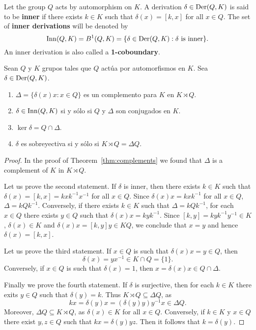 Let the group $Q$ acts by automorphism on $K$.
A derivation $\delta\in\operatorname{Der}(Q,K)$ is said to be \textbf{inner} if there exists $k\in K$ 
such that $\delta(x)=[k,x]$ for all $x\in Q$. The set of 
\textbf{inner derivations} will be denoted by 
\[
		\mathrm{Inn}(Q,K)=B^1(Q,K)=\{\delta\in\operatorname{Der}(Q,K):\text{$\delta$ is inner}\}.
\]
An inner derivation is also called a \textbf{1-coboundary}.

\begin{theorem}[Sysak]
	\label{theorem:Sysak}
	Sean $Q$ y $K$ grupos tales que $Q$ actúa por automorfismos en $K$. Sea
	$\delta\in\operatorname{Der}(Q,K)$.
	\begin{enumerate}
		\item $\Delta=\{\delta(x)x:x\in Q\}$ es un complemento para $K$ en $K\rtimes Q$.
		\item $\delta\in\mathrm{Inn}(Q,K)$ si y sólo si $Q$ y $\Delta$ son conjugados en
			$K$.
		\item $\ker\delta=Q\cap\Delta$.
		\item $\delta$ es sobreyectiva si y sólo si $K\rtimes Q=\Delta Q$.
	\end{enumerate}
\end{theorem}

\begin{proof}
	In the proof of Theorem~\ref{thm:complements} we 
	found that $\Delta$ is a complement of $K$ in $K\rtimes Q$. 

	Let us prove the second statement. If $\delta$ is inner, then there exists 
    $k\in K$ such that $\delta(x)=[k,x]=kxk^{-1}x^{-1}$ for all $x\in
	Q$. Since $\delta(x)x=kxk^{-1}$ for all $x\in Q$,  $\Delta=kQk^{-1}$.
	Conversely, if there exists $k\in K$ such that $\Delta=kQk^{-1}$, for each 
	$x\in Q$ there exists $y\in Q$ such that $\delta(x)x=kyk^{-1}$. Since
	$[k,y]=kyk^{-1}y^{-1}\in K$, $\delta(x)\in K$ and $\delta(x)x=[k,y]y\in KQ$,
	we conclude that  $x=y$ and hence $\delta(x)=[k,x]$. 

	Let us prove the third statement. If $x\in Q$ is such that $\delta(x)x=y\in
	Q$, then \[
	\delta(x)=yx^{-1}\in K\cap Q=\{1\}.
	\]
	Conversely, if $x\in Q$
	is such that $\delta(x)=1$, then $x=\delta(x)x\in Q\cap\Delta$. 

	Finally we prove the fourth statement. If $\delta$ is surjective, then for each 
	$k\in K$ there exits $y\in Q$ such that $\delta(y)=k$. Thus $K\rtimes Q\subseteq
	\Delta Q$, as 
	\[
	kx=\delta(y)x=(\delta(y)y)y^{-1}x\in \Delta Q.
	\]
	Moreover, 
	$\Delta Q\subseteq K\rtimes Q$, as $\delta(x)\in K$ for all $x\in Q$.
	Conversely, if $k\in K$ y $x\in Q$ there exist  
	$y,z\in Q$ such that $kx=\delta(y)yz$. Then it follows that 
	$k=\delta(y)$. 
\end{proof}

